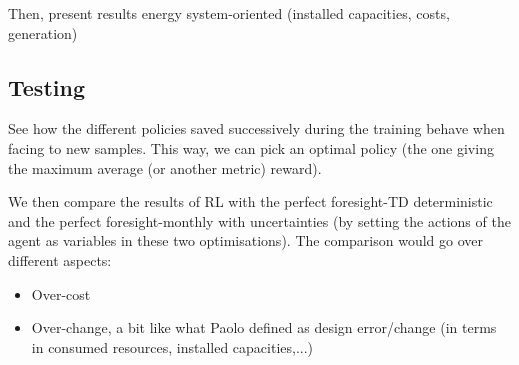 Then, present results energy system-oriented (installed capacities, costs, generation)

\subsection{Testing}
See how the different policies saved successively during the training behave when facing to new samples. This way, we can pick an optimal policy (the one giving the maximum average (or another metric) reward). 

We then compare the results of RL with the perfect foresight-TD deterministic and the perfect foresight-monthly with uncertainties (by setting the actions of the agent as variables in these two optimisations). The comparison would go over different aspects:
\begin{itemize}
\item Over-cost
\item Over-change, a bit like what Paolo defined as design error/change (in terms in consumed resources, installed capacities,...)
\end{itemize}


